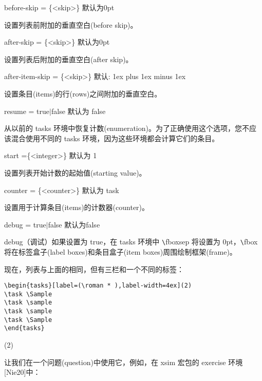 \documentclass[a4paper,12pt,indent]{article}
\begin{document}
before-skip = \{<skip>\} \hfill 默认为0pt

设置列表前附加的垂直空白(before skip)。

after-skip = \{<skip>\} \hfill 默认为0pt

设置列表后附加的垂直空白(after skip)。

after-item-skip = \{<skip>\} \hfill  默认: 1ex plus 1ex minus 1ex

设置条目(items)的行(rows)之间附加的垂直空白。

resume = true$|$false \hfill 默认为 false

从以前的 tasks 环境中恢复计数(enumeration)。为了正确使用这个选项，您不应该混合使用不同的 tasks 环境，因为这些环境都会计算它们的条目。


start =\{<integer>\} \hfill 默认为 1

设置列表开始计数的起始值(starting value)。

counter = \{<counter>\} \hfill 默认为 task

设置用于计算条目(items)的计数器(counter)。

debug = true$|$false \hfill 默认为false

debug（调试）如果设置为 true，在 tasks 环境中 \verb|\|\textcolor{Tasks}{fboxsep} 将设置为 0pt，\verb|\|\textcolor{Tasks}{fbox} 将在标签盒子(label boxes)和条目盒子(item boxes)周围绘制框架(frame)。

现在，列表与上面的相同，但有三栏和一个不同的标签：

\begin{tcolorbox}[collower=black,colframe=Tasks,colback=white]
    \begin{lstlisting}
\begin{tasks}[label=(\roman * ),label-width=4ex](2)
\task \Sample
\task \sample
\task \sample
\task \Sample
\end{tasks}
\end{lstlisting}
        \tcblower
        \begin{tasks}[
        label=(),
        label-width=4ex
        ](2)
            \task \Sample
            \task \sample
            \task \sample
            \task \Sample
    \end{tasks}
           \end{tcolorbox}

让我们在一个问题(question)中使用它，例如，在 xsim 宏包的 exercise 环境[Nie20]中：
\end{document}
